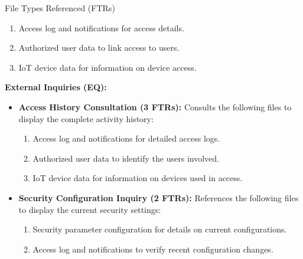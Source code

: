 \documentclass[12pt]{beamer}
\begin{document}
\begin{frame}[allowframebreaks]{File Types Referenced (FTRs)}
\begin{itemize}
    \begin{enumerate}
        \item Access log and notifications for access details.
        \item Authorized user data to link access to users.
        \item IoT device data for information on device access.
    \end{enumerate}
\end{itemize}

\textbf{External Inquiries (EQ):}

\begin{itemize}
    \item \textbf{Access History Consultation (3 FTRs):} Consults the following files to display the complete activity history:
    
    \begin{enumerate}
        \item Access log and notifications for detailed access logs.
        \item Authorized user data to identify the users involved.
        \item IoT device data for information on devices used in access.
    \end{enumerate}

\framebreak

    \item \textbf{Security Configuration Inquiry (2 FTRs):} References the following files to display the current security settings:
    
    \begin{enumerate}
        \item Security parameter configuration for details on current configurations.
        \item Access log and notifications to verify recent configuration changes.
    \end{enumerate}
\end{itemize}
\end{frame}
\end{document}

